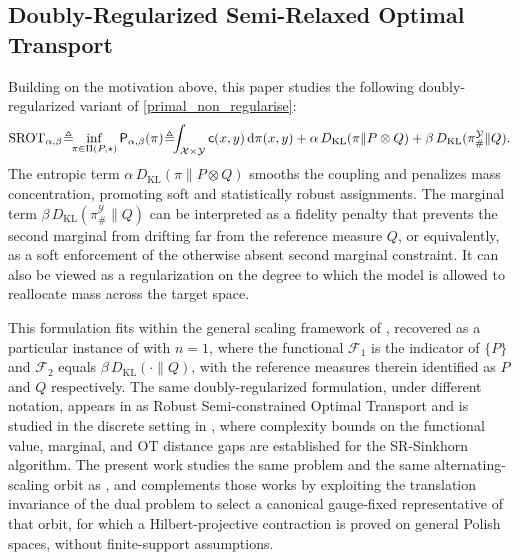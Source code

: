 \documentclass{article}
\begin{document}
\subsection{Doubly-Regularized Semi-Relaxed Optimal Transport}
\label{section_regularization}













Building on the motivation above, this paper studies the following doubly-regularized
variant of \eqref{primal_non_regularise}:
\begin{align}
  \label{primal_avec_2_KL}
  \mathrm{SROT}_{\alpha,\beta}  \hspace{-0.5ex} \triangleq \hspace{-1ex} \inf_{\pi \in \Pi(P,\star)}
  \mathsf{P}_{\alpha,\beta}(\pi)  \hspace{-0.5ex} \triangleq \hspace{-1ex}
  \int_{\mathcal{X} \times \mathcal{Y}} \mathsf{c}(x,y) \, \mathrm{d}\pi(x,y)
   + \alpha \, D_{\mathrm{KL}}(\pi \| P \otimes Q)
   +  \beta \, D_{\mathrm{KL}}(\pi^{\mathcal{Y}}_{\#} \| Q).
\end{align}
The entropic term $\alpha \, D_{\mathrm{KL}}(\pi \| P \otimes Q)$ smooths the coupling
and penalizes mass concentration, promoting soft and statistically robust assignments.
The marginal term $\beta \, D_{\mathrm{KL}}(\pi^{\mathcal{Y}}_{\#} \| Q)$ can be
interpreted as a fidelity penalty that prevents the second marginal from drifting far
from the reference measure $Q$, or equivalently, as a soft enforcement of the otherwise
absent second marginal constraint. It can also be viewed as a regularization on the
degree to which the model is allowed to reallocate mass across the target space.

This formulation fits within the general scaling framework of \cite{chizat2018scaling},
recovered as a particular instance of \cite[Equation~3.1]{chizat2018scaling} with $n=1$,
where the functional $\mathcal{F}_1$ is the indicator of $\{P\}$ and $\mathcal{F}_2$
equals $\beta \, D_{\mathrm{KL}}(\cdot \| Q)$, with the reference measures therein
identified as $P$ and $Q$ respectively. The same doubly-regularized formulation, under
different notation, appears in \cite{le2021robust} as Robust Semi-constrained Optimal
Transport and is studied in the discrete setting in \cite{fukunaga2022convergence}, where
complexity bounds on the functional value, marginal, and OT distance gaps are
established for the SR-Sinkhorn algorithm. The present work studies the same problem and
the same alternating-scaling orbit as \cite{le2021robust, fukunaga2022convergence}, and
complements those works by exploiting the translation invariance of the dual problem to
select a canonical gauge-fixed representative of that orbit, for which a Hilbert-projective
contraction is proved on general Polish spaces, without finite-support assumptions.
\end{document}
